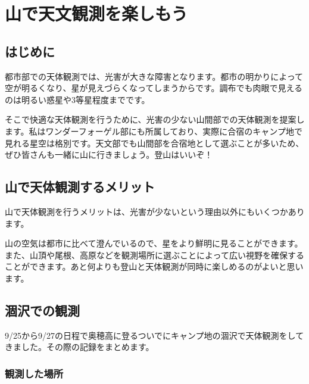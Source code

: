 \documentclass[../main]{subfiles}
\begin{document}
\chapter{山で天文観測を楽しもう} %


\section{はじめに}
都市部での天体観測では、光害が大きな障害となります。都市の明かりによって空が明るくなり、星が見えづらくなってしまうからです。調布でも肉眼で見えるのは明るい惑星や3等星程度までです。

そこで快適な天体観測を行うために、光害の少ない山間部での天体観測を提案します。私はワンダーフォーゲル部にも所属しており、実際に合宿のキャンプ地で見れる星空は格別です。天文部でも山間部を合宿地として選ぶことが多いため、ぜひ皆さんも一緒に山に行きましょう。登山はいいぞ！

\section{山で天体観測するメリット}
山で天体観測を行うメリットは、光害が少ないという理由以外にもいくつかあります。

山の空気は都市に比べて澄んでいるので、星をより鮮明に見ることができます。また、山頂や尾根、高原などを観測場所に選ぶことによって広い視野を確保することができます。あと何よりも登山と天体観測が同時に楽しめるのがよいと思います。

\section{涸沢での観測}

9/25から9/27の日程で奥穂高に登るついでにキャンプ地の涸沢で天体観測をしてきました。その際の記録をまとめます。

\subsection{観測した場所}
\end{document}
